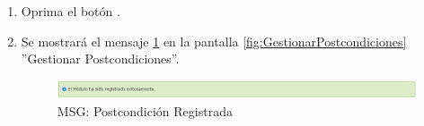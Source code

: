 \begin{enumerate}
			\item Oprima el botón \IUAceptar.
			
			\item Se mostrará el mensaje \ref{fig:postcondicionRegistrada} en la pantalla \ref{fig:GestionarPostcondiciones} ''Gestionar Postcondiciones''.
			
			\begin{figure}[htbp!]
				\begin{center}
					\includegraphics[scale=0.6]{roles/lider/casosUso/pantallas/IU5-1MSG1}
					\caption{MSG: Postcondición Registrada}
					\label{fig:postcondicionRegistrada}
				\end{center}
			\end{figure}
			\end{enumerate}